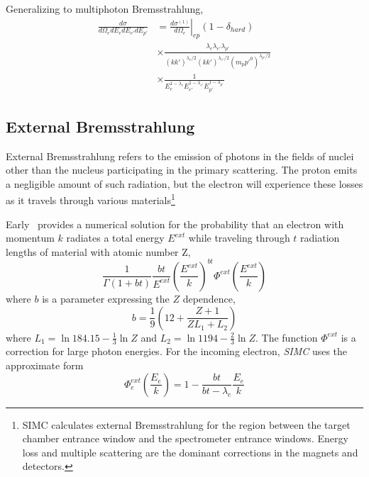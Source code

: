 Generalizing to multiphoton Bremsstrahlung,
\begin{align}
    \frac{d\sigma}{d\Omega_e dE_e dE_{e'} dE_{p'}} &= \left. \frac{d\sigma^{(1)}}{d\Omega_e}\right|_{ep} \left(1-\delta_{hard}\right) \\
    &\times\frac{\lambda_e \lambda_{e'} \lambda_{p'}} {\left(kk'\right)^{\lambda_e/2} \left(kk'\right)^{\lambda_{e'}/2} \left(m_p p'^0\right)^{\lambda_{p'}/2}} \\
    &\times\frac{1}{E_{e}^{1-\lambda_{e}} E_{e'}^{1-\lambda_{e'}} E_{p'}^{1-\lambda_{p'}}}
\end{align}

\subsection{External Bremsstrahlung}
External Bremsstrahlung refers to the emission of photons in the fields of
nuclei other than the nucleus participating in the primary scattering.
The proton emits a negligible amount of such radiation, but the electron will
experience these losses as it travels through various materials\footnote{
SIMC calculates external Bremsstrahlung for the region between the target
chamber entrance window and the spectrometer entrance windows.
Energy loss and multiple scattering are the dominant corrections in the magnets
and detectors.}

Early~\cite{Early_1973} provides a numerical solution for the probability that
an electron with momentum $k$ radiates a total energy $E^{ext}$ while traveling
through $t$ radiation lengths of material with atomic number Z,
\begin{equation}
    \frac{1}{\Gamma(1+bt)}
    \frac{bt}{E^{ext}}
    \left(\frac{E^{ext}}{k}\right)^{bt}
    \Phi^{ext}\left(\frac{E^{ext}}{k}\right)
\end{equation}
where $b$ is a parameter expressing the $Z$ dependence,
\begin{equation}
    b = \frac{1}{9}\left(12 + \frac{Z+1}{ZL_1+L_2}\right)
\end{equation}
where
$L_1 = \ln{184.15} - \frac{1}{3} \ln Z$
and
$L_2 = \ln{1194} - \frac{2}{3} \ln Z$.
The function $\Phi^{ext}$ is a correction for large photon energies.
For the incoming electron, \textit{SIMC} uses the approximate form
\begin{equation}
    \Phi^{ext}_e\left(\frac{E_e}{k}\right) = 1 - \frac{bt}{bt-\lambda_e}\frac{E_e}{k}
\end{equation}


